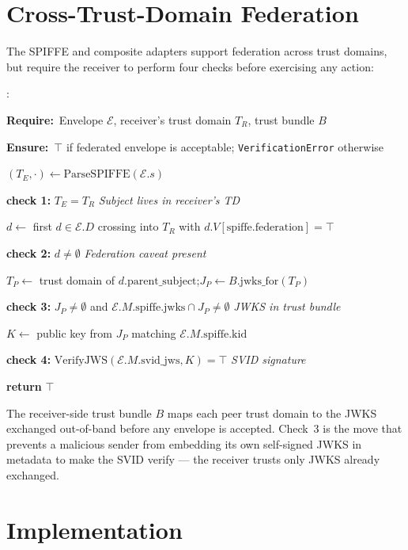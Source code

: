 \documentclass[11pt,a4paper]{article}
\newcommand{\AlgKwd}[1]{\textbf{#1}}
\newcommand{\Require}{\AlgKwd{Require:}~}
\newcommand{\Ensure}{\AlgKwd{Ensure:}~}
\newcommand{\Comment}[1]{\hfill\textit{\small#1}}
\newenvironment{algorithmic}
  {\begin{framed}\small\begin{list}{\arabic{enumi}:}{%
      \usecounter{enumi}\setlength{\itemsep}{0pt}\setlength{\parsep}{0pt}%
      \setlength{\leftmargin}{2.2em}\setlength{\labelwidth}{1.8em}}}
  {\end{list}\end{framed}}
\begin{document}
\section{Cross-Trust-Domain Federation}\label{sec:federation}

The SPIFFE and composite adapters support federation across trust
domains, but require the receiver to perform four checks before
exercising any action:

\begin{algo}
\caption{\textsc{VerifyFederated}($\mathcal{E}, T_R, B$)}\label{alg:fed}
\begin{algorithmic}
\item \Require Envelope $\mathcal{E}$, receiver's trust domain $T_R$, trust bundle $B$
\item \Ensure $\top$ if federated envelope is acceptable; \texttt{VerificationError} otherwise
\item $(T_E, \cdot) \gets \mathrm{ParseSPIFFE}(\mathcal{E}.s)$
\item \textbf{check 1:} $T_E = T_R$ \Comment{Subject lives in receiver's TD}
\item $d \gets$ first $d \in \mathcal{E}.D$ crossing into $T_R$ with $d.V[\text{spiffe.federation}] = \top$
\item \textbf{check 2:} $d \neq \emptyset$ \Comment{Federation caveat present}
\item $T_P \gets $ trust domain of $d.\text{parent\_subject}$;\quad $J_P \gets B.\text{jwks\_for}(T_P)$
\item \textbf{check 3:} $J_P \neq \emptyset$ and $\mathcal{E}.M.\text{spiffe.jwks} \cap J_P \neq \emptyset$ \Comment{JWKS in trust bundle}
\item $K \gets$ public key from $J_P$ matching $\mathcal{E}.M.\text{spiffe.kid}$
\item \textbf{check 4:} $\mathrm{VerifyJWS}(\mathcal{E}.M.\text{svid\_jws}, K) = \top$ \Comment{SVID signature}
\item \textbf{return} $\top$
\end{algorithmic}
\end{algo}

The receiver-side trust bundle $B$ maps each peer trust domain to the
JWKS exchanged out-of-band before any envelope is accepted. Check~3 is
the move that prevents a malicious sender from embedding its own
self-signed JWKS in metadata to make the SVID verify --- the receiver
trusts only JWKS already exchanged.

\section{Implementation}\label{sec:impl}
\end{document}
